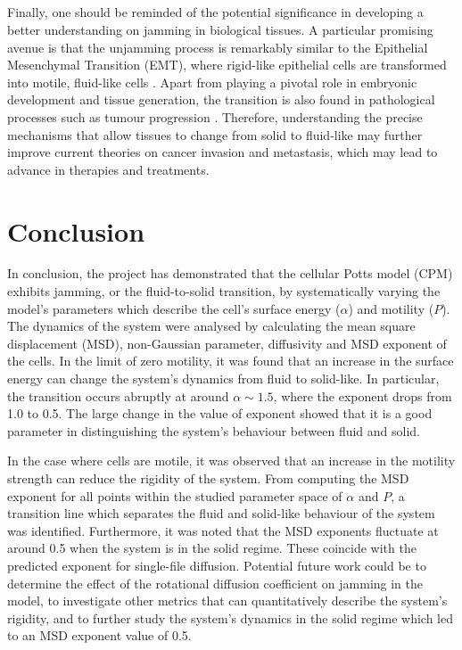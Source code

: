 \documentclass[a4paper,12pt]{article}
\begin{document}
\subsection*{}
Finally, one should be reminded of the potential significance in developing a better understanding on jamming in biological tissues. A particular promising avenue is that the unjamming process is remarkably similar to the Epithelial Mesenchymal Transition (EMT), where rigid-like epithelial cells are transformed into motile, fluid-like cells \cite{kalluri2009}. Apart from playing a pivotal role in embryonic development and tissue generation, the transition is also found in pathological processes such as tumour progression \cite{thiery2002}. Therefore, understanding the precise mechanisms that allow tissues to change from solid to fluid-like may further improve current theories on cancer invasion and metastasis, which may lead to advance in therapies and treatments. 


\section{Conclusion}
In conclusion, the project has demonstrated that the cellular Potts model (CPM) exhibits jamming, or the fluid-to-solid transition, by systematically varying the model's parameters which describe the cell's surface energy ($\alpha$) and motility ($P$). The dynamics of the system were analysed by calculating the mean square displacement (MSD), non-Gaussian parameter, diffusivity and MSD exponent of the cells. In the limit of zero motility, it was found that an increase in the surface energy can change the system's dynamics from fluid to solid-like. In particular, the transition occurs abruptly at around $\alpha \sim 1.5$, where the exponent drops from 1.0 to 0.5. The large change in the value of exponent showed that it is a good parameter in distinguishing the system's behaviour between fluid and solid. 

In the case where cells are motile, it was observed that an increase in the motility strength can reduce the rigidity of the system. From computing the MSD exponent for all points within the studied parameter space of $\alpha$ and $P$, a transition line which separates the fluid and solid-like behaviour of the system was identified.  Furthermore, it was noted that the MSD exponents fluctuate at around 0.5 when the system is in the solid regime. These coincide with the predicted exponent for single-file diffusion. Potential future work could be to determine the effect of the rotational diffusion coefficient on jamming in the model, to investigate other metrics that can quantitatively describe the system's rigidity, and to further study the system's dynamics in the solid regime which led to an MSD exponent value of 0.5. 
\end{document}
